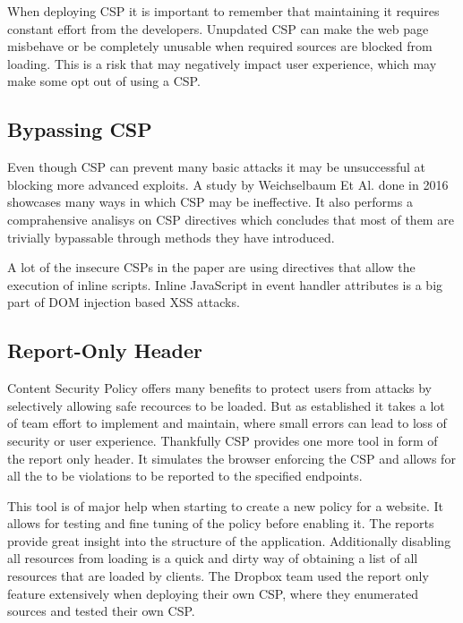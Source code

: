 \documentclass[12]{article}   %
\begin{document}
When deploying CSP it is important to remember that maintaining it requires constant effort from the developers.
Unupdated CSP can make the web page misbehave or be completely unusable when required sources are blocked from loading.
This is a risk that may negatively impact user experience, which may make some opt out of using a CSP.


\subsection{Bypassing CSP}
Even though CSP can prevent many basic attacks it may be unsuccessful at blocking more advanced exploits.
A study by Weichselbaum Et Al. done in 2016 showcases many ways in which CSP may be ineffective. \cite{weichselbaum2016csp}
It also performs a comprahensive analisys on CSP directives which concludes that most of them are trivially bypassable through methods they have introduced.

A lot of the insecure CSPs in the paper are using directives that allow the execution of inline scripts.
Inline JavaScript in event handler attributes is a big part of DOM injection based XSS attacks.



\subsection{Report-Only Header}
Content Security Policy offers many benefits to protect users from attacks by selectively allowing safe recources to be loaded.
But as established it takes a lot of team effort to implement and maintain, where small errors can lead to loss of security or user experience.
Thankfully CSP provides one more tool in form of the report only header.
It simulates the browser enforcing the CSP and allows for all the to be violations to be reported to the specified endpoints.

This tool is of major help when starting to create a new policy for a website.
It allows for testing and fine tuning of the policy before enabling it. 
The reports provide great insight into the structure of the application.
Additionally disabling all resources from loading is a quick and dirty way of obtaining a list of all resources that are loaded by clients.
The Dropbox team used the report only feature extensively when deploying their own CSP, where they enumerated sources and tested their own CSP. \cite{dropboxcsp}
\end{document}
